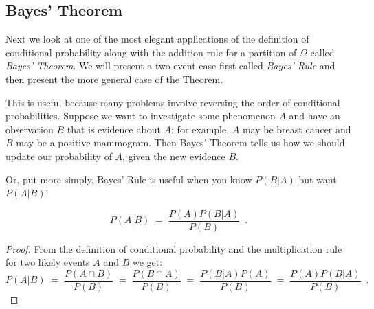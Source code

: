 \subsection{Bayes' Theorem}\label{S:BayesTheorem}
 Next we look at one of the most elegant applications of the definition of conditional probability along with the addition rule for a partition of $\Omega$ called \emph{Bayes' Theorem}. 
We will present a two event case first called \emph{Bayes' Rule} and then present the more general case of the Theorem.

This is useful because many problems involve reversing the order of conditional
probabilities. Suppose we want to investigate  some phenomenon $A$  and
have an observation $B$ that is evidence about $A$: for example, $A$ may
be breast cancer and $B$  may be a positive mammogram. Then  Bayes'
Theorem tells us how we should update our probability of $A$, given the
new evidence $B$.

Or, put more simply, Bayes' Rule is useful when you know $P(B | A)$ but
want $P(A | B )$!

\begin{framed}
\begin{prop}\label{P:BayesRule}
\begin{equation}
P(A|B)\;=\;\frac{P(A)P(B|A)}{P(B)} \enspace .
\end{equation}
\end{prop}
\end{framed}
\begin{proof}
From the  definition of conditional probability and the multiplication rule for two likely events $A$ and $B$ we get:
$$
P(A|B)\;=\;\frac{P(A \cap B)}{P(B)} \; = \;\frac{P(B \cap A)}{P(B)}\;= \; \frac{P(B|A)P(A)}{P(B)}\;  =\; \frac{P(A)P(B|A)}{P(B)} \enspace .
$$
\end{proof}

